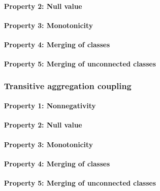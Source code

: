 \paragraph{Property 2: Null value}

\paragraph{Property 3: Monotonicity}

\paragraph{Property 4: Merging of classes}

\paragraph{Property 5: Merging of unconnected classes}

\subsubsection{Transitive aggregation coupling}
\paragraph{Property 1: Nonnegativity}

\paragraph{Property 2: Null value}

\paragraph{Property 3: Monotonicity}

\paragraph{Property 4: Merging of classes}

\paragraph{Property 5: Merging of unconnected classes}

